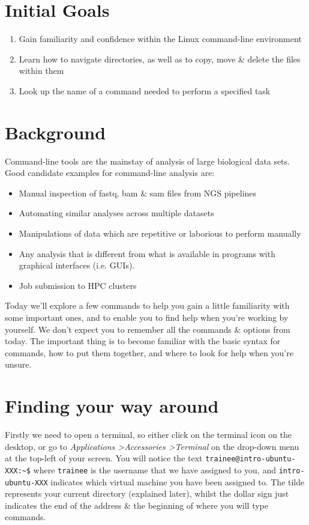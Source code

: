 \documentclass[a4paper,12pt,twoside]{memoir}
\begin{document}
\section{Initial Goals}
\begin{enumerate}
\item Gain familiarity and confidence within the Linux command-line environment
\item Learn how to navigate directories, as well as to copy, move \& delete the files within them
\item Look up the name of a command needed to perform a specified task
\end{enumerate}


\section{Background}
Command-line tools are the mainstay of analysis of large biological data sets.
Good candidate examples for command-line analysis are:
\begin{itemize}
\item Manual inspection of fastq, bam \& sam files from NGS pipelines
\item Automating similar analyses across multiple datasets
\item Manipulations of data which are repetitive or laborious to perform manually
\item Any analysis that is different from what is available in programs with graphical interfaces (i.e. GUIs).
\item Job submission to HPC clusters
\end{itemize}  

Today we'll explore a few commands to help you gain a little familiarity with some important ones, and to enable you to find help when you're working by yourself.
We don't expect you to remember all the commands \& options from today.
The important thing is to become familiar with the basic syntax for commands, how to put them together, and where to look for help when you're unsure.


\clearpage
\section{Finding your way around}
\begin{steps}
Firstly we need to open a terminal, so either click on the terminal icon on the desktop, or go to \textit{Applications \textgreater Accessories \textgreater Terminal} on the drop-down menu at the top-left of your screen.
You will notice the text \texttt{trainee@intro-ubuntu-XXX:\~{}\$} where \texttt{trainee} is the username that we have assigned to you, and \texttt{intro-ubuntu-XXX} indicates which virtual machine you have been assigned to.
The tilde represents your current directory (explained later), whilst the dollar sign just indicates the end of the address \& the beginning of where you will type commands. \\
\end{steps}
\end{document}

